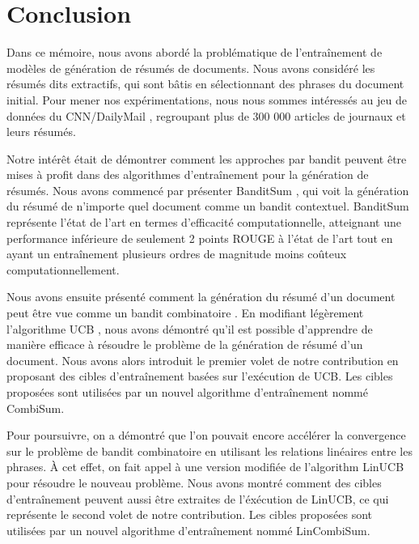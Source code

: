 \chapter*{Conclusion}           %
\label{chap:conclusion}         %

Dans ce mémoire, nous avons abordé la problématique de 
l'entraînement de modèles de génération de résumés de documents.
Nous avons considéré les résumés dits extractifs, qui sont bâtis 
en sélectionnant des phrases du document initial.
Pour mener nos expérimentations, nous nous sommes intéressés 
au jeu de données du CNN/DailyMail \citep{hermann2015teaching}, 
regroupant plus de 300 000 articles de journaux et leurs résumés.

Notre intérêt était de démontrer comment les approches par bandit \citep{Robbins:1952}
peuvent être mises à profit dans des algorithmes d'entraînement 
pour la génération de résumés.
Nous avons commencé par présenter BanditSum \citep{dong2018banditsum}, qui voit la génération 
du résumé de n'importe quel document comme un bandit contextuel.
BanditSum représente l'état de l'art en termes 
d'efficacité computationnelle, atteignant une performance inférieure de seulement 
2 points ROUGE à l'état de l'art tout en ayant un entraînement plusieurs ordres 
de magnitude moins coûteux computationnellement.

Nous avons ensuite présenté comment la génération du résumé d'un document peut être vue 
comme un bandit combinatoire \citep{CESABIANCHI20121404}.
En modifiant légèrement l'algorithme UCB \citep{ucb}, nous avons démontré 
qu'il est possible d'apprendre de manière efficace à résoudre le problème 
de la génération de résumé d'un document.
Nous avons alors introduit le premier volet de notre contribution 
en proposant des cibles d'entraînement basées sur l'exécution de UCB.
Les cibles proposées sont utilisées par un nouvel algorithme d'entraînement 
nommé CombiSum.

Pour poursuivre, on a démontré que l'on pouvait encore accélérer 
la convergence sur le problème de bandit combinatoire en utilisant 
les relations linéaires entre les phrases.
À cet effet, on fait appel à une version modifiée de l'algorithm LinUCB 
\citep{Li_2010} pour résoudre le nouveau problème.
Nous avons montré comment des cibles d'entraînement peuvent aussi être 
extraites de l'éxécution de LinUCB, ce qui représente le second volet de 
notre contribution.
Les cibles proposées sont utilisées par un nouvel algorithme d'entraînement 
nommé LinCombiSum.

